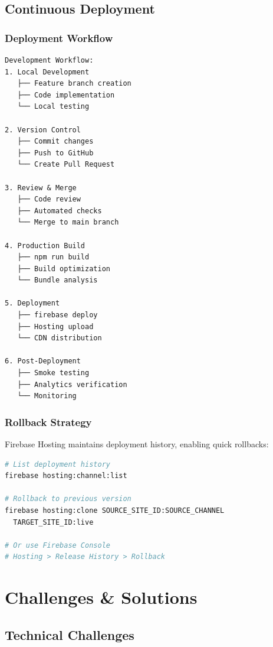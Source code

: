 \documentclass[12pt,a4paper]{report}
\begin{document}
\section{Continuous Deployment}

\subsection{Deployment Workflow}

\begin{verbatim}
Development Workflow:
1. Local Development
   ├── Feature branch creation
   ├── Code implementation
   └── Local testing

2. Version Control
   ├── Commit changes
   ├── Push to GitHub
   └── Create Pull Request

3. Review & Merge
   ├── Code review
   ├── Automated checks
   └── Merge to main branch

4. Production Build
   ├── npm run build
   ├── Build optimization
   └── Bundle analysis

5. Deployment
   ├── firebase deploy
   ├── Hosting upload
   └── CDN distribution

6. Post-Deployment
   ├── Smoke testing
   ├── Analytics verification
   └── Monitoring
\end{verbatim}

\subsection{Rollback Strategy}

Firebase Hosting maintains deployment history, enabling quick rollbacks:
\begin{lstlisting}[language=bash, caption=Rollback Commands]
# List deployment history
firebase hosting:channel:list

# Rollback to previous version
firebase hosting:clone SOURCE_SITE_ID:SOURCE_CHANNEL 
  TARGET_SITE_ID:live

# Or use Firebase Console
# Hosting > Release History > Rollback
\end{lstlisting}

\chapter{Challenges \& Solutions}

\section{Technical Challenges}
\end{document}
